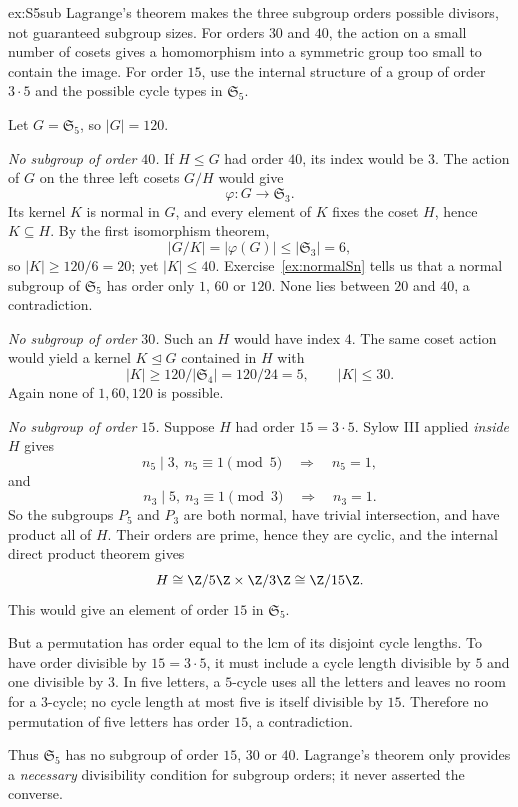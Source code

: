 \begin{solution}{ex:S5sub}
\idea Lagrange's theorem makes the three subgroup orders possible divisors, not guaranteed subgroup sizes. For orders $30$ and $40$, the action on a small number of cosets gives a homomorphism into a symmetric group too small to contain the image. For order $15$, use the internal structure of a group of order $3\cdot5$ and the possible cycle types in $\mathfrak S_5$.

\writeup Let $G=\mathfrak S_5$, so $|G|=120$.

\emph{No subgroup of order $40$.} If $H\le G$ had order $40$, its index would be $3$. The action of $G$ on the three left cosets $G/H$ would give
\[
\varphi:G\longrightarrow\mathfrak S_3.
\]
Its kernel $K$ is normal in $G$, and every element of $K$ fixes the coset $H$, hence $K\subseteq H$. By the first isomorphism theorem,
\[
|G/K|=|\varphi(G)|\le|\mathfrak S_3|=6,
\]
so $|K|\ge120/6=20$; yet $|K|\le40$. Exercise~\ref{ex:normalSn} tells us that a normal subgroup of $\mathfrak S_5$ has order only $1$, $60$ or $120$. None lies between $20$ and $40$, a contradiction.

\emph{No subgroup of order $30$.} Such an $H$ would have index $4$. The same coset action would yield a kernel $K\trianglelefteq G$ contained in $H$ with
\[
|K|\ge120/|\mathfrak S_4|=120/24=5,\qquad |K|\le30.
\]
Again none of $1,60,120$ is possible.

\emph{No subgroup of order $15$.} Suppose $H$ had order $15=3\cdot5$. Sylow III applied \emph{inside $H$} gives
\[
n_5\mid3,\ n_5\equiv1\pmod5
\quad\Longrightarrow\quad n_5=1,
\]
and
\[
n_3\mid5,\ n_3\equiv1\pmod3
\quad\Longrightarrow\quad n_3=1.
\]
So the subgroups $P_5$ and $P_3$ are both normal, have trivial intersection, and have product all of $H$. Their orders are prime, hence they are cyclic, and the internal direct product theorem gives
\[
H\cong\Z/5\Z\times\Z/3\Z\cong\Z/15\Z.
\]
This would give an element of order $15$ in $\mathfrak S_5$.

But a permutation has order equal to the lcm of its disjoint cycle lengths. To have order divisible by $15=3\cdot5$, it must include a cycle length divisible by $5$ and one divisible by $3$. In five letters, a $5$-cycle uses all the letters and leaves no room for a $3$-cycle; no cycle length at most five is itself divisible by $15$. Therefore no permutation of five letters has order $15$, a contradiction.

Thus $\mathfrak S_5$ has no subgroup of order $15$, $30$ or $40$. Lagrange's theorem only provides a \emph{necessary} divisibility condition for subgroup orders; it never asserted the converse.
\end{solution}

